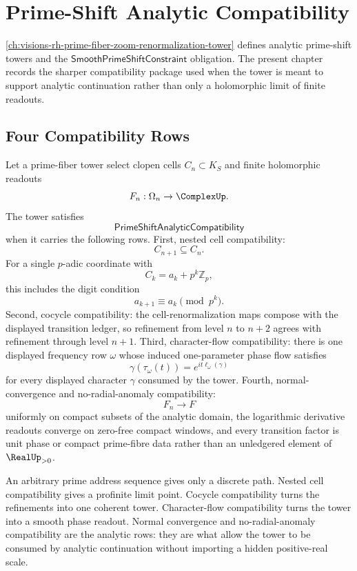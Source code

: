 \chapter{Prime-Shift Analytic Compatibility}
\label{ch:visions-rh-prime-shift-analytic-compatibility}

\autoref{ch:visions-rh-prime-fiber-zoom-renormalization-tower}
defines analytic prime-shift towers and the
$\mathsf{SmoothPrimeShiftConstraint}$ obligation. The present chapter
records the sharper compatibility package used when the tower is meant
to support analytic continuation rather than only a holomorphic limit of
finite readouts.

\section{Four Compatibility Rows}
\label{sec:rh-prime-shift-four-compatibility-rows}

\begin{definition}[PrimeShiftAnalyticCompatibility]
\label{def:rh-prime-shift-analytic-compatibility}
Let a prime-fiber tower select clopen cells $C_n\subset K_S$ and finite
holomorphic readouts
$$
F_n:\Omega_n\to\ComplexUp.
$$
The tower satisfies
$$
\mathsf{PrimeShiftAnalyticCompatibility}
$$
when it carries the following rows.
First, nested cell compatibility:
$$
C_{n+1}\subseteq C_n.
$$
For a single $p$-adic coordinate with
$$
C_k=a_k+p^k\mathbb Z_p,
$$
this includes the digit condition
$$
a_{k+1}\equiv a_k\pmod{p^k}.
$$
Second, cocycle compatibility: the cell-renormalization maps compose
with the displayed transition ledger, so refinement from level $n$ to
$n+2$ agrees with refinement through level $n+1$. Third,
character-flow compatibility: there is one displayed frequency row
$\omega$ whose induced one-parameter phase flow satisfies
$$
\gamma(\tau_{\omega}(t))
=
e^{it\ell_{\omega}(\gamma)}
$$
for every displayed character $\gamma$ consumed by the tower. Fourth,
normal-convergence and no-radial-anomaly compatibility:
$$
F_n\to F
$$
uniformly on compact subsets of the analytic domain, the logarithmic
derivative readouts converge on zero-free compact windows, and every
transition factor is unit phase or compact prime-fibre data rather than
an unledgered element of $\RealUp_{>0}$.
\end{definition}

\begin{principle}
\label{prin:rh-compatibility-separates-paths-from-flows}
An arbitrary prime address sequence gives only a discrete path. Nested
cell compatibility gives a profinite limit point. Cocycle compatibility
turns the refinements into one coherent tower. Character-flow
compatibility turns the tower into a smooth phase readout. Normal
convergence and no-radial-anomaly compatibility are the analytic rows:
they are what allow the tower to be consumed by analytic continuation
without importing a hidden positive-real scale.
\end{principle}

